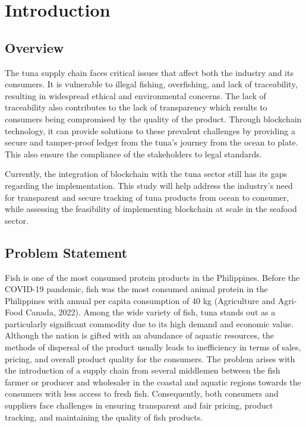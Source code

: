 \chapter{Introduction}
\label{sec:researchdesc}    %

\section{Overview}
\label{sec:overview}

The tuna supply chain faces critical issues that affect both the industry and its consumers. It is vulnerable to illegal fishing, overfishing, and lack of traceability, resulting in widespread ethical and environmental concerns. The lack of traceability also contributes to the lack of transparency which results to consumers being compromised by the quality of the product. Through blockchain technology, it can provide solutions to these prevalent challenges by providing a secure and tamper-proof ledger from the tuna's journey from the ocean to plate. This also ensure the compliance of the stakeholders to legal standards.

\noindent Currently, the integration of blockchain with the tuna sector still has its gaps regarding the implementation. This study will help address the industry’s need for transparent and secure tracking of tuna products from ocean to consumer, while assessing the feasibility of implementing blockchain at scale in the seafood sector.


\section{Problem Statement}

Fish is one of the most consumed protein products in the Philippines. Before the COVID-19 pandemic, fish was the most consumed animal protein in the Philippines with annual per capita consumption of 40 kg (Agriculture and Agri-Food Canada, 2022). Among the wide variety of fish, tuna stands out as a particularly significant commodity due to its high demand and economic value. Although the nation is gifted with an abundance of aquatic resources, the methods of dispersal of the product usually leads to inefficiency in terms of sales, pricing, and overall product quality for the consumers. The problem arises with the introduction of a supply chain from several middlemen between the fish farmer or producer and wholesaler in the coastal and aquatic regions towards the consumers with less access to fresh fish. Consequently, both consumers and suppliers face challenges in ensuring transparent and fair pricing, product tracking, and maintaining the quality of fish products.



